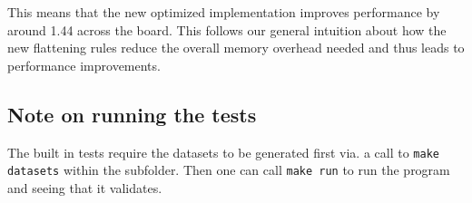 This means that the new optimized implementation improves performance by around
1.44 across the board. This follows our general intuition about how the new
flattening rules reduce the overall memory overhead needed and thus leads to
performance improvements.

\subsection*{Note on running the tests}
The built in tests require the datasets to be generated first via. a call to
\texttt{make datasets} within the subfolder. Then one can call \texttt{make
run} to run the program and seeing that it validates.

